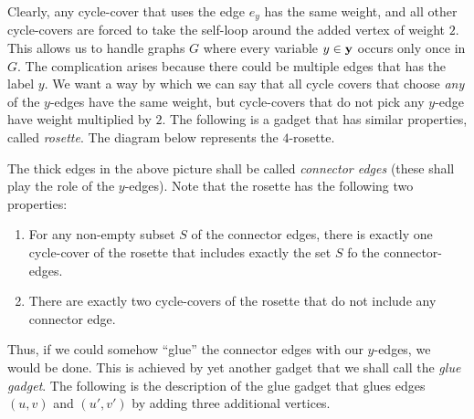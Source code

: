 Clearly, any cycle-cover that uses the edge $e_y$ has the same weight, and all other cycle-covers are forced to take the self-loop around the added vertex of weight $2$. This allows us to handle graphs $G$ where every variable $y \in \mathbf{y}$ occurs only once in $G$. The complication arises because there could be multiple edges that has the label $y$. We want a way by which we can say that all cycle covers that choose \emph{any} of the $y$-edges have the same weight, but cycle-covers that do not pick any $y$-edge have weight multiplied by $2$. The following is a gadget that has similar properties, called \emph{rosette}. The diagram below represents the $4$-rosette. 
\begin{center}
\end{center}
The thick edges in the above picture shall be called \emph{connector edges} (these shall play the role of the $y$-edges). Note that the rosette has the following two properties:
\begin{enumerate}
\item For any non-empty subset $S$ of the connector edges, there is exactly one cycle-cover of the rosette that includes exactly the set $S$ fo the connector-edges. 
\item There are exactly two cycle-covers of the rosette that do not include any connector edge. 
\end{enumerate}
Thus, if we could somehow ``glue'' the connector edges with our $y$-edges, we would be done. This is achieved by yet another gadget that we shall call the \emph{glue gadget}. The following is the description of the glue gadget that glues edges $(u,v)$ and $(u',v')$ by adding three additional vertices. 

